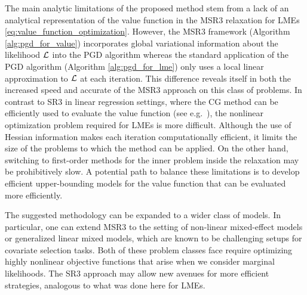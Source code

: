     The main analytic limitations of the proposed method stem from a lack of an analytical representation of the value function in the MSR3 relaxation for LMEs
    \eqref{eq:value_function_optimization}. 
    However, the MSR3 framework (Algorithm \ref{alg:pgd_for_value})
    incorporates global variational information about
    the likelihood $\operatorname{\mathcal{L}}$ into the PGD algorithm whereas the standard application of the PGD algorithm (Algorithm \ref{alg:pgd_for_lme}) only uses a local linear approximation to
    $\operatorname{\mathcal{L}}$ at each iteration. This difference reveals itself in both the increased speed and accurate of the MSR3 approach on this class of problems.
{In contrast to SR3 in linear regression settings, where the CG method can be efficiently used to evaluate the value function (see e.g.~\cite{Baraldi2019}),  
 the nonlinear optimization problem required for LMEs is more difficult.} 
{Although the use of
Hessian information makes each iteration computationally efficient, it limits the size of the problems to which the method can be applied. 
On the other hand, switching to first-order methods for the inner problem inside the relaxation may be prohibitively slow. 
A potential path to balance these limitations is to develop efficient upper-bounding models for the value function that can be evaluated more efficiently.
}
    
    The suggested methodology can be expanded to a wider class of models. In particular, one can extend MSR3 to the setting of non-linear mixed-effect models or generalized linear mixed models, which are known to be challenging setups for covariate selection tasks. Both of these problem classes face require optimizing highly nonlinear objective functions that arise when we consider marginal likelihoods. 
The SR3  approach may allow new avenues for more efficient strategies, analogous to what was done here for LMEs. 

